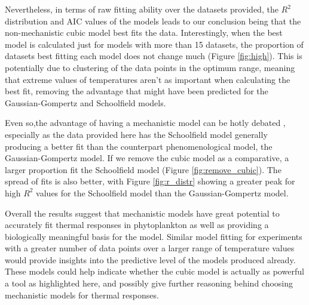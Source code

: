 \documentclass[11pt]{article}
\begin{document}
Nevertheless, in terms of raw fitting ability over the datasets provided, the \(R^2\) distribution and AIC values of the models leads to our conclusion being that the non-mechanistic cubic model best fits the data. Interestingly, when the best model is calculated just for models with more than 15 datasets, the proportion of datasets best fitting each model does not change much (Figure \ref{fig:high}). This is potentially due to clustering of the data points in the optimum range, meaning that extreme values of temperatures aren't as important when calculating the best fit, removing the advantage that might have been predicted for the Gaussian-Gompertz and Schoolfield models.



Even so,the advantage of having a mechanistic model can be hotly debated \citep{OConnor2007},  especially as the data provided here has the Schoolfield model generally producing a better fit than the counterpart phenomenological model, the Gaussian-Gompertz model. If we remove the cubic model as a comparative, a larger proportion fit the Schoolfield model (Figure \ref{fig:remove_cubic}). The spread of fits is also better, with Figure \ref{fig:r_distr} showing a greater peak for high \(R^2\) values for the Schoolfield model than the Gaussian-Gompertz model. 

Overall the results suggest that mechanistic models have great potential to accurately fit thermal responses in phytoplankton as well as providing a biologically meaningful basis for the model. Similar model fitting for experiments with a greater number of data points over a larger range of temperature values would provide insights into the predictive level of the models produced already. These models could help indicate whether the cubic model is actually as powerful a tool as highlighted here, and possibly give further reasoning behind choosing mechanistic models for thermal responses.



\FloatBarrier


\end{document}
